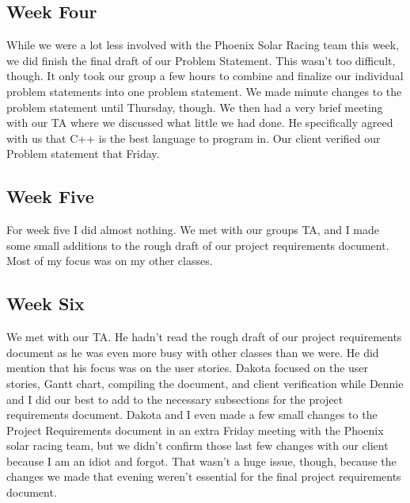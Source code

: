 \begin{singlespace}
\subsection{Week Four}
While we were a lot less involved with the Phoenix Solar Racing team this week, we did finish the final draft of our Problem Statement.
This wasn't too difficult, though.
It only took our group a few hours to combine and finalize our individual problem statements into one problem statement.
We made minute changes to the problem statement until Thursday, though.
We then had a very brief meeting with our TA where we discussed what little we had done.
He specifically agreed with us that C++ is the best language to program in.
Our client verified our Problem statement that Friday.

\subsection{Week Five}
For week five I did almost nothing.
We met with our groups TA, and I made some small additions to the rough draft of our project requirements document.
Most of my focus was on my other classes.

\subsection{Week Six}
We met with our TA.
He hadn't read the rough draft of our project requirements document as he was even more busy with other classes than we were.
He did mention that his focus was on the user stories.
Dakota focused on the user stories, Gantt chart, compiling the document, and client verification while Dennie and I did our best to add to the necessary subsections for the project requirements document.
Dakota and I even made a few small changes to the Project Requirements document in an extra Friday meeting with the Phoenix solar racing team, but we didn't confirm those last few changes with our client because I am an idiot and forgot.
That wasn't a huge issue, though, because the changes we made that evening weren't essential for the final project requirements document.


\end{singlespace}

